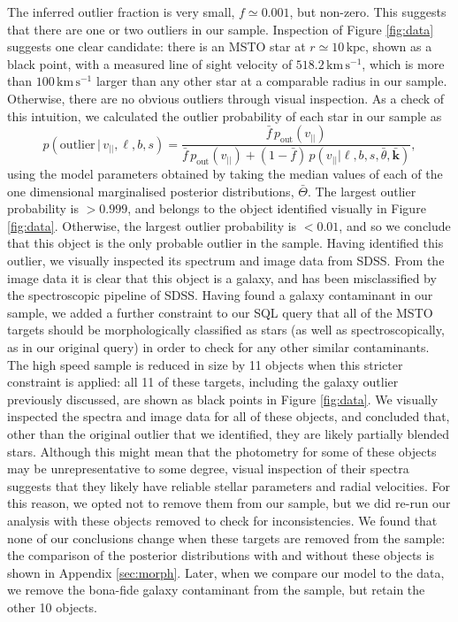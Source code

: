 \documentclass[useAMS,twocolumn,usenatbib]{mn2e}
\def\kpc{{\,\mathrm{kpc}}}
\def\kms{{\,\mathrm{km\,s^{-1}}}}
\def\vlos{{v_{||}}}
\begin{document}
The inferred outlier fraction is very small, $f \simeq 0.001$, but non-zero. 
This suggests that there are one or two outliers in our sample. 
Inspection of Figure \ref{fig:data} suggests one clear candidate: there is an MSTO star at $r\simeq10\kpc$, shown as a black point, with a measured line of sight velocity of $518.2\kms$, which is more than $100\kms$ larger than any other star at a comparable radius in our sample. 
Otherwise, there are no obvious outliers through visual inspection. 
As a check of this intuition, we calculated the outlier probability of each star in our sample as 
%
\begin{equation}
p(\mathrm{outlier}\,|\,\vlos,\ell,b,s) = \dfrac{\bar{f}\,p_\mathrm{out}(\vlos)}{\bar{f}\,p_\mathrm{out}(\vlos) + 
                                                      (1-\bar{f})\,p(\vlos | \ell,b,s,\bar{\theta},\bar{\boldsymbol{k}})},
\end{equation}
%     
using the model parameters obtained by taking the median values of each of the one dimensional marginalised posterior distributions, $\bar{\Theta}$.  
The largest outlier probability is $>0.999$, and belongs to the object identified visually in Figure \ref{fig:data}. 
Otherwise, the largest outlier probability is $<0.01$, and so we conclude that this object is the only probable outlier in the sample. 
Having identified this outlier, we visually inspected its spectrum and image data from SDSS.
From the image data it is clear that this object is a galaxy, and has been misclassified by the spectroscopic pipeline of SDSS.
Having found a galaxy contaminant in our sample, we added a further constraint to our {\sc SQL} query that all of the MSTO targets should be morphologically classified as stars (as well as spectroscopically, as in our original query) in order to check for any other similar contaminants.
The high speed sample is reduced in size by 11 objects when this stricter constraint is applied: all 11 of these targets, including the galaxy outlier previously discussed, are shown as black points in Figure \ref{fig:data}.
We visually inspected the spectra and image data for all of these objects, and concluded that, other than the original outlier that we identified, they are likely partially blended stars.
Although this might mean that the photometry for some of these objects may be unrepresentative to some degree, visual inspection of their spectra suggests that they likely have reliable stellar parameters and radial velocities.
For this reason, we opted not to remove them from our sample, but we did re-run our analysis with these objects removed to check for inconsistencies.
We found that none of our conclusions change when these targets are removed from the sample: the comparison of the posterior distributions with and without these objects is shown in Appendix \ref{sec:morph}.
Later, when we compare our model to the data, we remove the bona-fide galaxy contaminant from the sample, but retain the other 10 objects.
\end{document}
